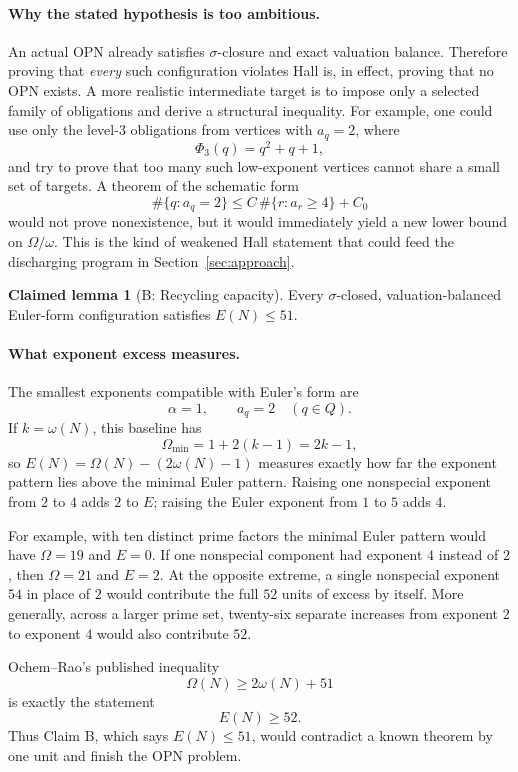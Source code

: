 \documentclass[11pt]{article}
\theoremstyle{definition}
\newtheorem{claim}[theorem]{Claimed lemma}
\theoremstyle{remark}
\begin{document}
\paragraph{Why the stated hypothesis is too ambitious.}
An actual OPN already satisfies $\sigma$-closure and exact valuation balance.
Therefore proving that \emph{every} such configuration violates Hall is, in
effect, proving that no OPN exists.  A more realistic intermediate target is
to impose only a selected family of obligations and derive a structural
inequality.  For example, one could use only the level-$3$ obligations from
vertices with $a_q=2$, where
\[
\Phi_3(q)=q^2+q+1,
\]
and try to prove that too many such low-exponent vertices cannot share a
small set of targets.  A theorem of the schematic form
\[
\#\{q:a_q=2\}\le C\,\#\{r:a_r\ge4\}+C_0
\]
would not prove nonexistence, but it would immediately yield a new lower
bound on $\Omega/\omega$.  This is the kind of weakened Hall statement that
could feed the discharging program in Section~\ref{sec:approach}.

\begin{claim}[B: Recycling capacity]
Every $\sigma$-closed, valuation-balanced Euler-form configuration
satisfies $E(N)\le 51$.
\end{claim}

\paragraph{What exponent excess measures.}
The smallest exponents compatible with Euler's form are
\[
\alpha=1,\qquad a_q=2\quad(q\in Q).
\]
If $k=\omega(N)$, this baseline has
\[
\Omega_{\min}=1+2(k-1)=2k-1,
\]
so $E(N)=\Omega(N)-(2\omega(N)-1)$ measures exactly how far the exponent
pattern lies above the minimal Euler pattern.  Raising one nonspecial
exponent from $2$ to $4$ adds $2$ to $E$; raising the Euler exponent from
$1$ to $5$ adds $4$.

For example, with ten distinct prime factors the minimal Euler pattern would
have $\Omega=19$ and $E=0$.  If one nonspecial component had exponent $4$
instead of $2$, then $\Omega=21$ and $E=2$.  At the opposite extreme, a
single nonspecial exponent $54$ in place of $2$ would contribute the full
$52$ units of excess by itself.  More generally, across a larger prime set,
twenty-six separate increases from exponent $2$ to exponent $4$ would also
contribute $52$.

Ochem--Rao's published inequality
\[
\Omega(N)\ge2\omega(N)+51
\]
is exactly the statement
\[
E(N)\ge52.
\]
Thus Claim B, which says $E(N)\le51$, would contradict a known theorem by one
unit and finish the OPN problem.
\end{document}
